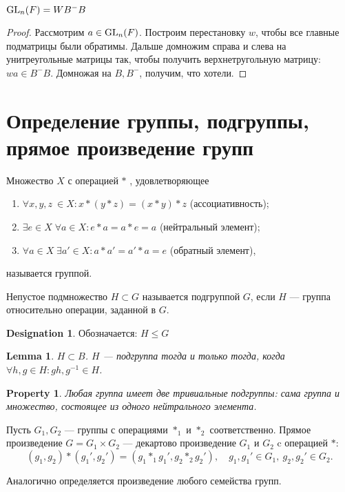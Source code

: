 \documentclass[11pt]{book}
\newcommand{\GL}{{\mathop{\text{\rm GL}}}}
\renewcommand{\le}{\leqslant}
\theoremstyle{definition}
\theoremstyle{plain}
\theoremstyle{plain}
\newtheorem{lm}{Lemma}
\newtheorem*{prop}{Property}
\theoremstyle{definition}
\newtheorem*{name}{Designation}
\theoremstyle{remark}
\begin{document}
\begin{thm}
    $ \GL_{n}(F) = WB^{-}B$
\end{thm}
\begin{proof}
    Рассмотрим $ a \in \GL_{n}(F)$. Построим перестановку $ w$, чтобы все главные подматрицы были обратимы. Дальше домножим справа и слева на унитреугольные матрицы так, чтобы получить верхнетругольную матрицу:
    $wa \in  B^- B$. Домножая на $B, B^-$, получим, что хотели.
\end{proof}

\section{Определение группы, подгруппы, прямое произведение групп}
\begin{defn}
    Множество $X$ с операцией $*$ , удовлетворяющее
    \begin{enumerate}
	\item $\forall x,y,z \: \in X: x*(y*z) = (x*y)*z$  (ассоциативность);
	\item $\exists e \in X \; \forall a \in X: e*a = a*e = a$ (нейтральный элемент);
	\item $\forall a \in X \; \exists a' \in X: a*a' = a' * a = e $ (обратный элемент),
    \end{enumerate}
    называется {\sf группой}.
\end{defn}
\begin{defn}
    Непустое подмножество $H \subset G$ называется {\sf подгруппой} $ G$, если $H$ --- группа относительно операции, заданной в $G$.
    \begin{name}
	Обозначается: $H \le G$
    \end{name}
\end{defn}
\begin{lm}
    $H \subset B$.
    $H$ --- подгруппа тогда и только тогда, когда $ \forall h, g \in H: gh, g^{-1} \in  H$.
\end{lm}
\begin{prop}
    Любая группа имеет две тривиальные подгруппы: сама группа и множество, состоящее из одного нейтрального элемента.
\end{prop}
\begin{defn}
    Пусть  $ G_1, G_2$ --- группы с операциями  $ *_1$ и $ *_2$ соответственно. {\sf Прямое произведение}  $ G = G_1 \times G_2$ --- декартово произведение  $ G_1$ и $ G_2$ c операцией $ *$:
    \[
	(g_1, g_2) * (g_1', g_2') = (g_1 *_1 g_1', g_2*_2 g_2'), \quad g_1, g_1' \in G_1, ~ g_2, g_2' \in G_2
    .\]

    Аналогично определяется произведение любого семейства групп.
\end{defn}
\end{document}
